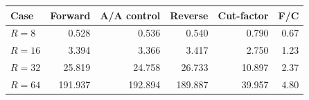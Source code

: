 \begin{center}\begin{tabular}{lrrrrr}\toprule
Case & Forward & A/A control & Reverse & Cut-factor & F/C\\\midrule
$R=8$ & 0.528 & 0.536 & 0.540 & 0.790 & 0.67\\
$R=16$ & 3.394 & 3.366 & 3.417 & 2.750 & 1.23\\
$R=32$ & 25.819 & 24.758 & 26.733 & 10.897 & 2.37\\
$R=64$ & 191.937 & 192.894 & 189.887 & 39.957 & 4.80\\
\bottomrule\end{tabular}\end{center}

